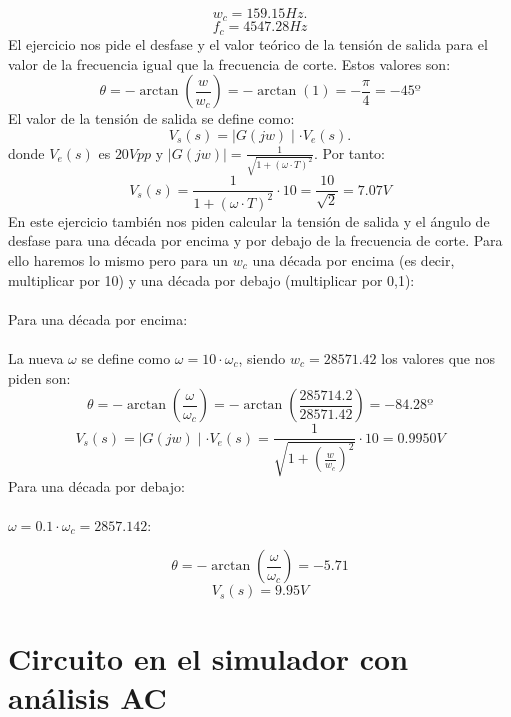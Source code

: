 \documentclass[11pt,letterpaper]{article}
\begin{document}
\[
w_c=159.15 Hz
.\] 
\begin{equation}
f_c= 4547.28 Hz
\end{equation}
El ejercicio nos pide el desfase y el valor teórico de la tensión de salida para el valor de la frecuencia igual que la frecuencia de corte. Estos valores son:
\begin{equation}
	\boxed{	\theta= -\arctan \left( \frac{w}{w_c} \right) =-\arctan(1)=-\frac{\pi}{4}=-45º}
\end{equation}
El valor de la tensión de salida se define como:
\[
	V_s(s)= \mid G(jw) \mid \cdot V_e(s)
.\]
donde $V_e(s)$  es $20 Vpp$ y  $ \mid G(jw) \mid =\frac{1}{\sqrt{1+\left( \omega\cdot T \right) ^2}}$. Por tanto:
\begin{equation}
	\boxed{V_s(s)=\frac{1}{1+\left( \omega\cdot T \right) ^2}\cdot 10=\frac{10}{\sqrt{2} }=7.07 V}
\end{equation}
En este ejercicio también nos piden calcular la tensión de salida y el ángulo de desfase para una década por encima y por debajo de la frecuencia de corte. Para ello haremos lo mismo pero para un $w_c$ una década por encima (es decir, multiplicar por 10) y una década por debajo (multiplicar por 0,1):\\
\\
Para una década por encima:\\
\\
La nueva $\omega$ se define como $\omega=10\cdot \omega_c$, siendo $w_c=28571.42$ los valores que nos piden son:
\begin{equation}
	\boxed{\theta= -\arctan\left( \frac{\omega}{\omega_c} \right) = -\arctan\left( \frac{285714.2}{28571.42} \right) =-84.28º}
\end{equation}
\begin{equation}
\boxed{V_s\left( s \right) = \mid G(jw) \mid \cdot V_e(s)=\frac{1}{\sqrt{1+\left( \frac{w}{w_c} \right)^2}} \cdot 10= 0.9950 V}
\end{equation}
Para una década por debajo:\\
\\
$\omega=0.1\cdot \omega_c= 2857.142$:

\begin{equation}
	\boxed{\theta=-\arctan \left( \frac{\omega}{\omega_c} \right) =-5.71}
\end{equation}
 \begin{equation}
	 \boxed{V_s\left( s \right) = 9.95 V}
\end{equation}

\section{Circuito en el simulador con análisis AC}%
\label{sec:Circuito en el simulador con análisis AC}
\end{document}
